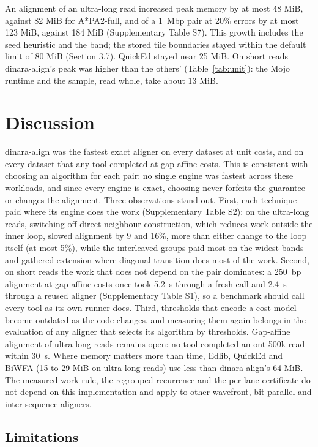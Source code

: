 \documentclass[nocrop,noinfo]{bioinfo}
\begin{document}
An alignment of an ultra-long read increased peak memory by at most 48 MiB, against 82 MiB for A*PA2-full, and of a 1~Mbp pair at 20\% errors by at most 123 MiB, against 184 MiB (Supplementary Table S7). This growth includes the seed heuristic and the band; the stored tile boundaries stayed within the default limit of 80 MiB (Section 3.7). QuickEd stayed near 25 MiB. On short reads dinara-align's peak was higher than the others' (Table~\ref{tab:unit}): the Mojo runtime and the sample, read whole, take about 13 MiB.

\section{Discussion}

dinara-align was the fastest exact aligner on every dataset at unit costs, and on every dataset that any tool completed at gap-affine costs. This is consistent with choosing an algorithm for each pair: no single engine was fastest across these workloads, and since every engine is exact, choosing never forfeits the guarantee or changes the alignment. Three observations stand out. First, each technique paid where its engine does the work (Supplementary Table S2): on the ultra-long reads, switching off direct neighbour construction, which reduces work outside the inner loop, slowed alignment by 9 and 16\%, more than either change to the loop itself (at most 5\%), while the interleaved groups paid most on the widest bands and gathered extension where diagonal transition does most of the work. Second, on short reads the work that does not depend on the pair dominates: a 250~bp alignment at gap-affine costs once took 5.2~\textmu s through a fresh call and 2.4~\textmu s through a reused aligner (Supplementary Table S1), so a benchmark should call every tool as its own runner does. Third, thresholds that encode a cost model become outdated as the code changes, and measuring them again belongs in the evaluation of any aligner that selects its algorithm by thresholds. Gap-affine alignment of ultra-long reads remains open: no tool completed an ont-500k read within 30~s. Where memory matters more than time, Edlib, QuickEd and BiWFA (15 to 29 MiB on ultra-long reads) use less than dinara-align's 64 MiB. The measured-work rule, the regrouped recurrence and the per-lane certificate do not depend on this implementation and apply to other wavefront, bit-parallel and inter-sequence aligners.

\subsection{Limitations}
\end{document}
